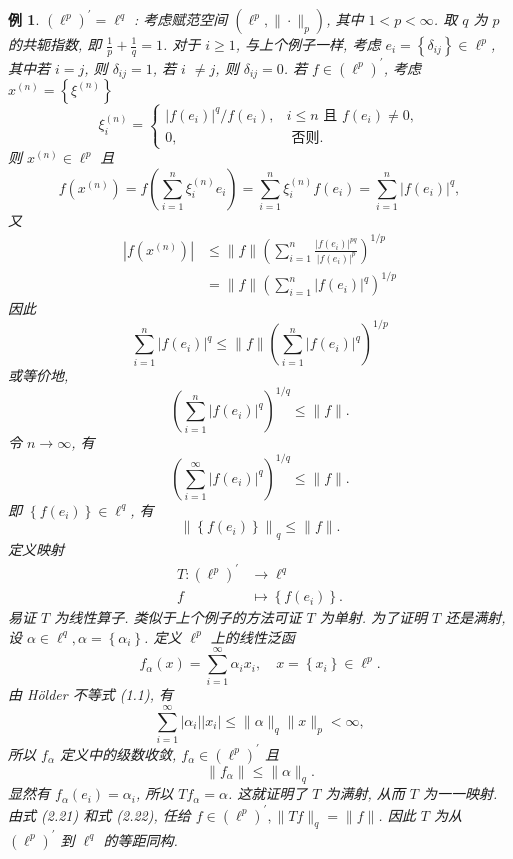 \documentclass[openany]{ctexbook}
\theoremstyle{kaiti}
\theoremstyle{normal}
\newtheorem{example}{例}[section]
\begin{document}
\begin{example}
$\left(\ell^{p}\right)^{\prime}=\ell^{q}$ : 考虑赋范空间 $\left(\ell^{p},\|\cdot\|_{p}\right)$, 其中 $1<p<\infty$. 取 $q$ 为 $p$ 的共轭指数, 即 $\frac{1}{p}+\frac{1}{q}=1$. 对于 $i \geqslant 1$, 与上个例子一样, 考虑 $e_{i}=\left\{\delta_{i j}\right\} \in \ell^{p}$, 其中若 $i=j$, 则 $\delta_{i j}=1$, 若 $i$ $\neq j$, 则 $\delta_{i j}=0$. 若 $f \in\left(\ell^{p}\right)^{\prime}$, 考虑 $x^{(n)}=\left\{\xi^{(n)}\right\}$
$$
\xi_{i}^{(n)}= \begin{cases}\left|f\left(e_{i}\right)\right|^{q} / f\left(e_{i}\right), & i \leqslant n \text { 且 } f\left(e_{i}\right) \neq 0, \\ 0, & \text { 否则. }\end{cases}
$$
则 $x^{(n)} \in \ell^{p}$ 且
$$
f\left(x^{(n)}\right)=f\left(\sum_{i=1}^n \xi_{i}^{(n)} e_{i}\right)=\sum_{i=1}^n \xi_{i}^{(n)} f\left(e_{i}\right)=\sum_{i=1}^n\left|f\left(e_{i}\right)\right|^{q},
$$
又
$$
\begin{aligned}
\left|f\left(x^{(n)}\right)\right| & \leqslant\|f\|\left(\sum_{i=1}^n \frac{\left|f\left(e_{i}\right)\right|^{p q}}{\left|f\left(e_{i}\right)\right|^{p}}\right)^{1 / p} \\
&=\|f\|\left(\sum_{i=1}^n\left|f\left(e_{i}\right)\right|^{q}\right)^{1 / p}
\end{aligned}
$$
因此
$$
\sum_{i=1}^n\left|f\left(e_{i}\right)\right|^{q} \leqslant\|f\|\left(\sum_{i=1}^n\left|f\left(e_{i}\right)\right|^{q}\right)^{1 / p}
$$
或等价地,
$$
\left(\sum_{i=1}^n\left|f\left(e_{i}\right)\right|^{q}\right)^{1 / q} \leqslant\|f\|.
$$
令 $n \rightarrow \infty$, 有
$$
\left(\sum_{i=1}^{\infty}\left|f\left(e_{i}\right)\right|^{q}\right)^{1 / q} \leqslant\|f\|.
$$
即 $\left\{f\left(e_{i}\right)\right\} \in \ell^{q}$, 有
\begin{equation}
  \left\|\left\{f\left(e_{i}\right)\right\}\right\|_{q} \leqslant\|f\|.
\end{equation}
定义映射
$$
\begin{aligned}
T:\left(\ell^{p}\right)^{\prime} & \rightarrow \ell^{q} \\
f & \mapsto\left\{f\left(e_{i}\right)\right\}.
\end{aligned}
$$
易证 $T$ 为线性算子. 类似于上个例子的方法可证 $T$ 为单射. 为了证明 $T$ 还是满射, 设 $\alpha \in \ell^{q}, \alpha=\left\{\alpha_{i}\right\}$. 定义 $\ell^{p}$ 上的线性泛函
$$
f_{\alpha}(x)=\sum_{i=1}^{\infty} \alpha_{i} x_{i}, \quad x=\left\{x_{i}\right\} \in \ell^{p}.
$$
由 Hölder 不等式 (1.1), 有
$$
\sum_{i=1}^{\infty}\left|\alpha_{i}\right|\left|x_{i}\right| \leqslant\|\alpha\|_{q}\|x\|_{p}<\infty,
$$
所以 $f_{\alpha}$ 定义中的级数收敛, $f_{\alpha} \in\left(\ell^{p}\right)^{\prime}$ 且
\begin{equation}
  \left\|f_{\alpha}\right\| \leqslant\|\alpha\|_{q}.
\end{equation}
显然有 $f_{\alpha}\left(e_{i}\right)=\alpha_{i}$, 所以 $T f_{\alpha}=\alpha$. 这就证明了 $T$ 为满射, 从而 $T$ 为一一映射. 由式 (2.21) 和式 (2.22), 任给 $f \in\left(\ell^{p}\right)^{\prime},\|T f\|_{q}=\|f\|$. 因此 $T$ 为从 $\left(\ell^{p}\right)^{\prime}$ 到 $\ell^{q}$ 的等距同构.
\end{example}
\end{document}
